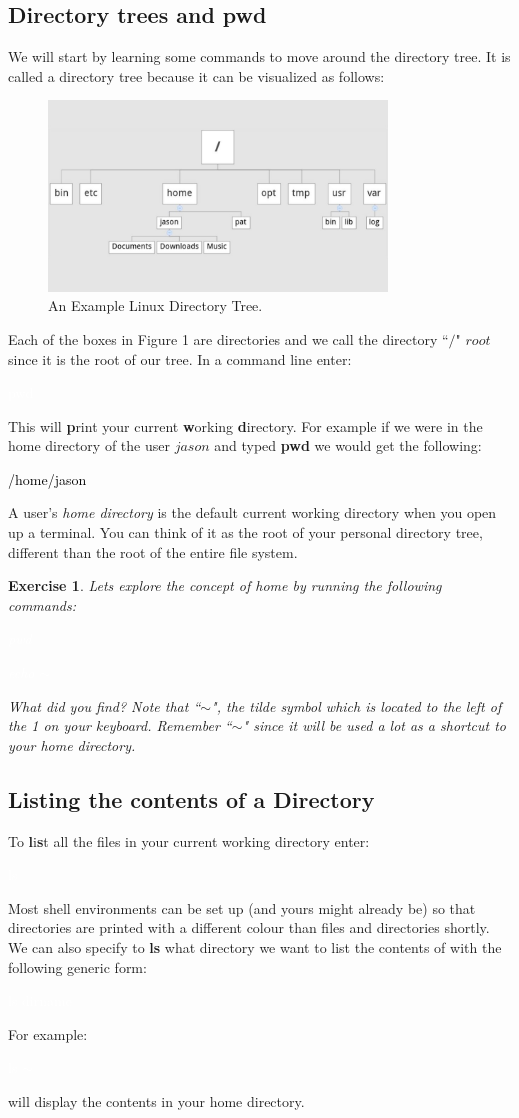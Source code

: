 \documentclass[oneside]{book}
\newcommand{\commandline}[1]{\begin{center} \colorbox{Dark}{\textcolor{white}{#1}} \end{center}}
\newcommand{\exampleout}[1]{\begin{center} \colorbox{Light}{\textcolor{black}{#1}} \end{center}}
\newtheorem{ex}{Exercise}[chapter]
\begin{document}
\subsection{Directory trees and pwd}
We will start by learning some commands to move around the directory tree. It is called a directory tree because it can be visualized as follows:

\begin{figure}[H]
	\centering
	\label{tab:directory_tree}
	\includegraphics[width=90mm]{linux-directory-tree.jpg}
	\caption{An Example Linux Directory Tree.} 
\end{figure}

Each of the boxes in Figure 1 are directories and we call the directory ``$/$" $root$ since it is the root of our tree. In a command line enter:
	\commandline{pwd}
  This will \textbf{p}rint your current \textbf{w}orking \textbf{d}irectory. For example if we were in the home directory of the user $jason$ and typed \textbf{pwd} we would get the following:
	\exampleout {/home/jason}
	
A user's \textit{home directory} is the default current working directory when you open up a terminal. You can think of it as the root of your personal directory tree, different than the root of the entire file system.


\begin{ex} 
	Lets explore the concept of home by running the following commands:
	\commandline{pwd}
	\commandline{echo $\sim$ }
	What did you find? Note that ``$\sim$", the tilde symbol which is located to the left of the 1 on your keyboard. Remember ``$\sim$" since it will be used a lot as a shortcut to your home directory.
\end{ex}

\subsection{Listing the contents of a Directory}
To \textbf{l}i\textbf{s}t all the files in your current working directory enter:
	\commandline{ls}
	Most shell environments can be set up (and yours might already be) so that directories are printed with a different colour than files and directories shortly. We can also specify to \textbf{ls} what directory we want to list the contents of with the following generic form:
  	\commandline{ls dirname}
For example:
	\commandline{ls $\sim$}
will display the contents in your home directory.
\end{document}

